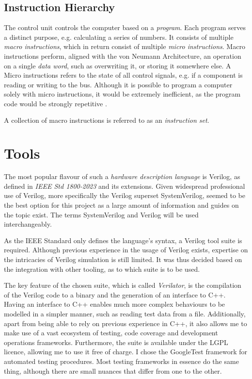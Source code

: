 \subsection{Instruction Hierarchy}
The control unit controls the computer based on a \textit{program}. Each program serves a distinct purpose, e.g. calculating a series of numbers. It consists of multiple \textit{macro instructions}, which in return consist of multiple \textit{micro instructions}. Macro instructions perform, aligned with the von Neumann Architecture, an operation on a single \textit{data word}, such as overwriting it, or storing it somewhere else. A Micro instructions refers to the state of all control signals, e.g. if a component is reading or writing to the bus. Although it is possible to program a computer solely with micro instructions, it would be extremely inefficient, as the program code would be strongly repetitive \cite{malvino1983a}.

A collection of macro instructions is referred to as an \textit{instruction set}. 

\section{Tools} \label{sec:tools}

The most popular flavour of such a \textit{hardware description language} is Verilog, as defined in \textit{IEEE Std 1800-2023} \cite{10458102} and its extensions. Given widespread professional use of Verilog, more specifically the Verilog superset SystemVerilog, seemed to be the best option for this project as a large amount of information and guides on the topic exist. The terms SystemVerilog and Verilog will be used interchangeably. 

As the IEEE Standard only defines the language's syntax, a Verilog tool suite is required. Although previous experience in the usage of Verilog exists, expertise on the intricacies of Verilog simulation is still limited. It was thus decided based on the integration with other tooling, as to which suite is to be used. 

The key feature of the chosen suite, which is called \textit{Verilator}, is the compilation of the Verilog code to a binary and the generation of an interface to C++. Having an interface to C++ enables much more complex behaviours to be modelled in a simpler manner, such as reading test data from a file. Additionally, apart from being able to rely on previous experience in C++, it also allows me to make use of a vast ecosystem of testing, code coverage and development operations frameworks. Furthermore, the suite is available under the LGPL licence, allowing me to use it free of charge. I chose the GoogleTest framework for automated testing procedures. Most testing frameworks in essence do the same thing, although there are small nuances that differ from one to the other. 

